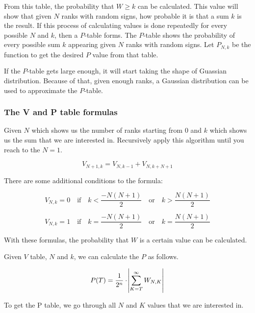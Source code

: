 \documentclass[12pt]{article}
\begin{document}
{From this table, the probability that $W\geq k$ can be calculated. This value will show that given $N$ ranks with random signs, how probable it is that a sum $k$ is the result. If this process of calculating values is done repeatedly for every possible $N$ and $k$, then a $P$-table forms. The $P$-table shows the probability of every possible sum $k$ appearing given $N$ ranks with random signs. Let $P_{N, k}$ be the function to get the desired $P$ value from that table.

If the $P$-table gets large enough, it will start taking the shape of Guassian distribution. Because of that, given enough ranks, a Gaussian distribution can be used to approximate the $P$-table.

\subsubsection{The V and P table formulas}
\label{sec:v_p_table_formulas}

Given $N$ which shows us the number of ranks starting from $0$ and $k$ which shows us the sum that we are interested in. Recursively apply this algorithm until you reach to the $N = 1$.

\begin{equation}
  V_{N+1, k} = V_{N, k-1} + V_{N, k+N+1}
\end{equation}

There are some additional conditions to the formula:

\begin{equation}
V_{N, k} = 0  \quad\text{if}\quad k <  \frac{-N(N+1)}{2} \quad\text{or}\quad k >  \frac{N(N+1)}{2}
\end{equation}

\begin{equation}
V_{N, k} = 1 \quad\text{if}\quad k =  \frac{ -N(N+1)}{2} \quad\text{or}\quad k =  \frac{N(N+1)}{2}
\end{equation}

With these formulas, the probability that $W$ is a certain value can be calculated.

Given $V$ table, $N$ and $k$, we can calculate the $P$ as follows.

\begin{equation}
P(T) = \frac{1}{2^n} \cdot \abs{\sum\limits_{K=T}^{\infty}{W_{N,K}}}
\end{equation}

To get the P table, we go through all $N$ and $K$ values that we are interested in.

}
\end{document}
